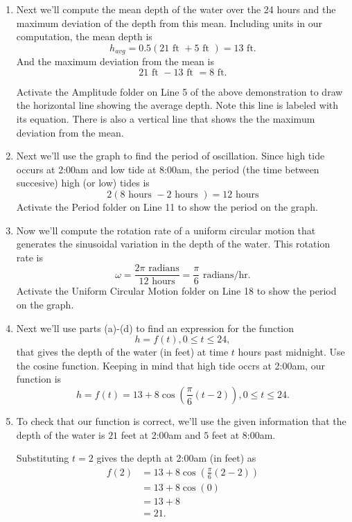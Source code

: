 \documentclass{ximera}
\begin{document}
\begin{example}
\begin{explanation}
\begin{enumerate}
\item Next we'll compute the mean depth of the water over the 24 hours and the maximum deviation of the depth from this mean. Including units in our computation, the mean depth is 
\[
    h_{avg} = 0.5 ( 21 \text{ ft } + 5 \text{ ft }) = 13 \text{ ft} . 
\]
And the maximum deviation from the mean is
\[
     21 \text{ ft } - 13 \text{ ft } = 8 \text{ ft}.
\]

Activate the Amplitude folder on Line 5 of the above demonstration to draw the horizontal line showing the average depth. Note this line is labeled with its equation. There is also a vertical line that shows the the maximum deviation from the mean.

\item Next we'll use the graph to find the period of oscillation. Since high tide occurs at 2:00am and low tide at 8:00am, the period (the time between succesive) high (or low) tides is
\[
    2(8 \text{ hours } - 2 \text{ hours }) = 12 \text{ hours}
\]
Activate the Period folder on Line 11 to show the period on the graph.

\item Now we'll compute the rotation rate of a uniform circular motion that generates the sinusoidal variation in the depth of the water. This rotation rate is
\[
  \omega = \frac{2\pi \text{ radians}}{12 \text{ hours}} = \frac{\pi}{6} \text{ radians/hr} .
\]
Activate the Uniform Circular Motion folder on Line 18 to show the period on the graph.

\item Next we'll use parts (a)-(d) to find an expression for the function 
\[
   h = f(t) ,  0\leq t \leq 24, 
\]
that gives the depth of the water (in feet) at time $t$ hours past midnight. Use the cosine function. Keeping in mind that high tide occrs at 2:00am, our function is 
\[
   h  = f(t) = 13 + 8 \cos \left(  \frac{\pi}{6} \left( t - 2 \right) \right),  0\leq t \leq 24.
\]



\item To check that our function is correct, we'll use the given information that the depth of the water is $21$ feet at 2:00am and $5$ feet at 8:00am.

Substituting $t=2$ gives the depth at 2:00am (in feet) as
\begin{align*}
   f(2)   & = 13 + 8 \cos \left(  \frac{\pi}{6} \left( 2 - 2 \right) \right) \\ 
           & = 13 + 8 \cos (0)  \\ 
           & = 13 + 8 \\
           & = 21 .
\end{align*}


\end{enumerate}
\end{explanation}
\end{example}
\end{document}
